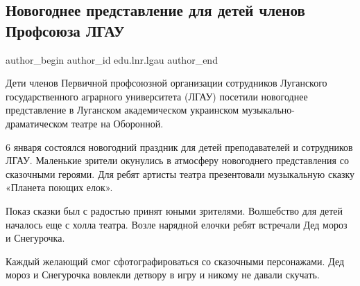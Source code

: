  
 
 
 
 
\subsection{Новогоднее представление для детей членов Профсоюза ЛГАУ}
\label{sec:06_01_2022.stz.edu.lnr.lgau.1.novyj_god_predstavlenie_deti}

\ifcmt
 author_begin
   author_id edu.lnr.lgau
 author_end
\fi

\begin{zznagolos}
Дети членов Первичной профсоюзной организации сотрудников Луганского
государственного аграрного университета (ЛГАУ) посетили новогоднее
представление в Луганском академическом украинском музыкально-драматическом
театре на Оборонной.	
\end{zznagolos}


6 января состоялся новогодний праздник для детей преподавателей и сотрудников
ЛГАУ. Маленькие зрители окунулись в атмосферу новогоднего представления со
сказочными героями. Для ребят артисты театра презентовали музыкальную сказку
«Планета поющих елок».


Показ сказки был с радостью принят юными зрителями. Волшебство для детей
началось еще с холла театра. Возле нарядной елочки ребят встречали Дед мороз и
Снегурочка.

Каждый желающий смог сфотографироваться со сказочными персонажами. Дед мороз и
Снегурочка вовлекли детвору в игру и никому не давали скучать.


